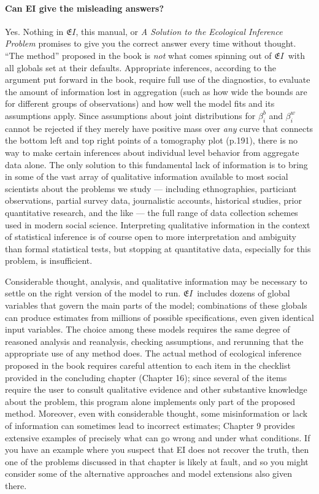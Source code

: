 \documentclass[11pt,titlepage]{article}
\newcommand{\EI}{\ensuremath{{\mathfrak EI}}}
\begin{document}
\paragraph{Can EI give the misleading answers?}
Yes.  Nothing in \EI, this manual, or \emph{A Solution to the
  Ecological Inference Problem} promises to give you the correct
answer every time without thought.  ``The method'' proposed in the
book is \emph{not} what comes spinning out of \EI\ with all globals
set at their defaults.  Appropriate inferences, according to the
argument put forward in the book, require full use of the diagnostics,
to evaluate the amount of information lost in aggregation (such as how
wide the bounds are for different groups of observations) and how well
the model fits and its assumptions apply.  Since assumptions about
joint distributions for $\beta_i^b$ and $\beta_i^w$ cannot be rejected
if they merely have positive mass over \emph{any} curve that connects
the bottom left and top right points of a tomography plot (p.191),
there is no way to make certain inferences about individual level
behavior from aggregate data alone.  The only solution to this
fundamental lack of information is to bring in some of the vast array
of qualitative information available to most social scientists about
the problems we study --- including ethnographies, particiant
observations, partial survey data, journalistic accounts, historical
studies, prior quantitative research, and the like --- the full range
of data collection schemes used in modern social science.
Interpreting qualitative information in the context of statistical
inference is of course open to more interpretation and ambiguity than
formal statistical tests, but stopping at quantitative data,
especially for this problem, is insufficient.

Considerable thought, analysis, and qualitative information may be
necessary to settle on the right version of the model to run.  \EI\
includes dozens of global variables that govern the main parts of the
model; combinations of these globals can produce estimates from
millions of possible specifications, even given identical input
variables.  The choice among these models requires the same degree of
reasoned analysis and reanalysis, checking assumptions, and rerunning
that the appropriate use of any method does.  The actual method of
ecological inference proposed in the book requires careful attention
to each item in the checklist provided in the concluding chapter
(Chapter 16); since several of the items require the user to consult
qualitative evidence and other substantive knowledge about the
problem, this program alone implements only part of the proposed
method.  Moreover, even with considerable thought, some misinformation
or lack of information can sometimes lead to incorrect estimates;
Chapter 9 provides extensive examples of precisely what can go wrong
and under what conditions.  If you have an example where you suspect
that EI does not recover the truth, then one of the problems discussed
in that chapter is likely at fault, and so you might consider some of
the alternative approaches and model extensions also given there.
\end{document}
